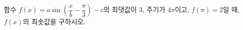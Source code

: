 함수 $f(x)=a\sin\left(\dfrac{x}{b}-\dfrac{\pi}{3}\right)-c$의 최댓값이 $3$, 주기가 $4\pi$이고, $f(\pi)=2$일 때, $f(x)$의 최솟값을 구하시오. 

